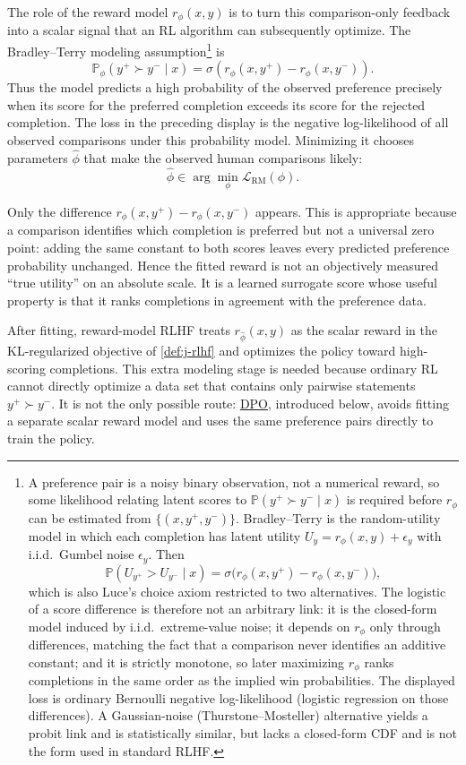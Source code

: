 \documentclass[11pt,a4paper]{article}
\newcommand{\jump}[2]{\hyperref[#1]{#2}}
\theoremstyle{definition}
\begin{document}
\begin{remark}
The role of the reward model $r_\phi(x,y)$ is to turn this comparison-only feedback into a
scalar signal that an RL algorithm can subsequently optimize. The Bradley--Terry modeling
assumption\footnote{A preference pair is a noisy binary observation, not a numerical
reward, so some likelihood relating latent scores to $\mathbb{P}(y^+\succ y^-\mid x)$ is
required before $r_\phi$ can be estimated from $\{(x,y^+,y^-)\}$. Bradley--Terry is the
random-utility model in which each completion has latent utility
$U_y=r_\phi(x,y)+\epsilon_y$ with i.i.d.\ Gumbel noise $\epsilon_y$. Then
\[
\mathbb{P}(U_{y^+}>U_{y^-}\mid x)
=\sigma\!\bigl(r_\phi(x,y^+)-r_\phi(x,y^-)\bigr),
\]
which is also Luce's choice axiom restricted to two alternatives. The logistic of a score
difference is therefore not an arbitrary link: it is the closed-form model induced by
i.i.d.\ extreme-value noise; it depends on $r_\phi$ only through differences, matching
the fact that a comparison never identifies an additive constant; and it is strictly
monotone, so later maximizing $r_\phi$ ranks completions in the same order as the
implied win probabilities. The displayed loss is ordinary Bernoulli negative
log-likelihood (logistic regression on those differences). A Gaussian-noise
(Thurstone--Mosteller) alternative yields a probit link and is statistically similar, but
lacks a closed-form CDF and is not the form used in standard RLHF.} is
\[
\mathbb{P}_\phi\!\left(y^+\succ y^-\mid x\right)
=\sigma\!\left(r_\phi(x,y^+)-r_\phi(x,y^-)\right).
\]
Thus the model predicts a high probability of the observed preference precisely when its score
for the preferred completion exceeds its score for the rejected completion. The loss in the
preceding display is the negative log-likelihood of all observed comparisons under this
probability model. Minimizing it chooses parameters $\widehat\phi$ that make the observed
human comparisons likely:
\[
\widehat\phi\in\arg\min_\phi\mathcal{L}_{\mathrm{RM}}(\phi).
\]

Only the difference
$r_\phi(x,y^+)-r_\phi(x,y^-)$ appears. This is appropriate because a comparison identifies
which completion is preferred but not a universal zero point: adding the same constant to both
scores leaves every predicted preference probability unchanged. Hence the fitted reward is not
an objectively measured ``true utility'' on an absolute scale. It is a learned surrogate score
whose useful property is that it ranks completions in agreement with the preference data.

After fitting, reward-model RLHF treats $r_{\widehat\phi}(x,y)$ as the scalar reward in the
KL-regularized objective of \cref{def:j-rlhf} and optimizes the policy toward high-scoring
completions. This extra modeling stage is needed because ordinary RL cannot directly
optimize a data set that contains only pairwise statements $y^+\succ y^-$. It is not the
only possible route: \jump{rem:dpo}{DPO}, introduced below, avoids fitting a separate
scalar reward model and uses the same preference pairs directly to train the policy.
\end{remark}
\end{document}
